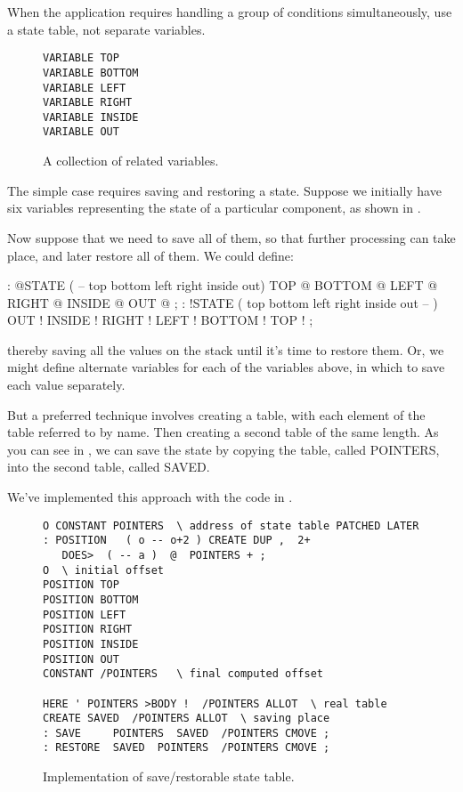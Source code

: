 \begin{tip}
When the application requires handling a group of conditions
simultaneously, use a state table, not separate variables.
\end{tip}
\begin{figure*}[hhhh]
\caption{A collection of related variables.}
\begin{center}
\begin{BVerbatim}
VARIABLE TOP
VARIABLE BOTTOM
VARIABLE LEFT
VARIABLE RIGHT
VARIABLE INSIDE
VARIABLE OUT
\end{BVerbatim}
\end{center}
\end{figure*}

The simple case requires saving and restoring a state. Suppose we initially
have six variables representing the state of a particular component, as
shown in .

Now suppose that we need to save all of them, so that further processing
can take place, and later restore all of them. We could define:

\begin{Code}
: @STATE ( -- top bottom left right inside out)
   TOP @  BOTTOM @  LEFT @  RIGHT @  INSIDE @  OUT @ ;
: !STATE ( top bottom left right inside out -- )
   OUT !  INSIDE !  RIGHT !  LEFT !  BOTTOM !  TOP ! ;
\end{Code}
thereby saving all the values on the stack until it's time to restore them.
Or, we might define alternate variables for each of the variables above, in
which to save each value separately.

But a preferred technique involves creating a table, with each
element of the table referred to by name. Then creating a second table of
the same length. As you can see in , we can save the state by
copying the table, called POINTERS, into the second table, called
SAVED.



We've implemented this approach with the code in .

\begin{figure*}[tttt]
\caption{Implementation of save/restorable state table.}
\begin{center}
\begin{BVerbatim}
O CONSTANT POINTERS  \ address of state table PATCHED LATER
: POSITION   ( o -- o+2 ) CREATE DUP ,  2+
   DOES>  ( -- a )  @  POINTERS + ;
O  \ initial offset
POSITION TOP
POSITION BOTTOM
POSITION LEFT
POSITION RIGHT
POSITION INSIDE
POSITION OUT
CONSTANT /POINTERS   \ final computed offset

HERE ' POINTERS >BODY !  /POINTERS ALLOT  \ real table
CREATE SAVED  /POINTERS ALLOT  \ saving place
: SAVE     POINTERS  SAVED  /POINTERS CMOVE ;
: RESTORE  SAVED  POINTERS  /POINTERS CMOVE ;
\end{BVerbatim}
\end{center}
\end{figure*}

